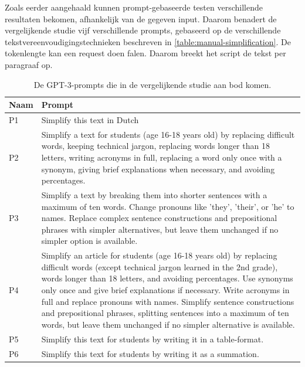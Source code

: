 \medspace

Zoals eerder aangehaald kunnen prompt-gebaseerde testen verschillende resultaten bekomen, afhankelijk van de gegeven input. Daarom benadert de vergelijkende studie vijf verschillende prompts, gebaseerd op de verschillende tekstvereenvoudigingstechnieken beschreven in \ref{table:manual-simplification}. De tokenlengte kan een request doen falen. Daarom breekt het script de tekst per paragraaf op.

\begin{center}
	\begin{table}[H]
		\begin{tabular}{ | m{2cm} | m{14cm} | } 
			\hline
			\textbf{Naam} & \textbf{Prompt} \\
			\hline
			P1 & Simplify this text in Dutch \\
			\hline
			P2 & Simplify a text for students (age 16-18 years old) by replacing difficult words, keeping technical jargon, replacing words longer than 18 letters, writing acronyms in full, replacing a word only once with a synonym, giving brief explanations when necessary, and avoiding percentages. \\
			\hline
			P3 & Simplify a text by breaking them into shorter sentences with a maximum of ten words. Change pronouns like 'they', 'their', or 'he' to names. Replace complex sentence constructions and prepositional phrases with simpler alternatives, but leave them unchanged if no simpler option is available. \\
			\hline
			P4 & Simplify an article for students (age 16-18 years old) by replacing difficult words (except technical jargon learned in the 2nd grade), words longer than 18 letters, and avoiding percentages. Use synonyms only once and give brief explanations if necessary. Write acronyms in full and replace pronouns with names. Simplify sentence constructions and prepositional phrases, splitting sentences into a maximum of ten words, but leave them unchanged if no simpler alternative is available. \\
			\hline
			P5 & Simplify this text for students by writing it in a table-format. \\
			\hline
			P6 & Simplify this text for students by writing it as a summation. \\
			\hline
		\end{tabular}
		\label{table:tested-prompts}
		\caption{De GPT-3-prompts die in de vergelijkende studie aan bod komen.}
	\end{table}
\end{center}



